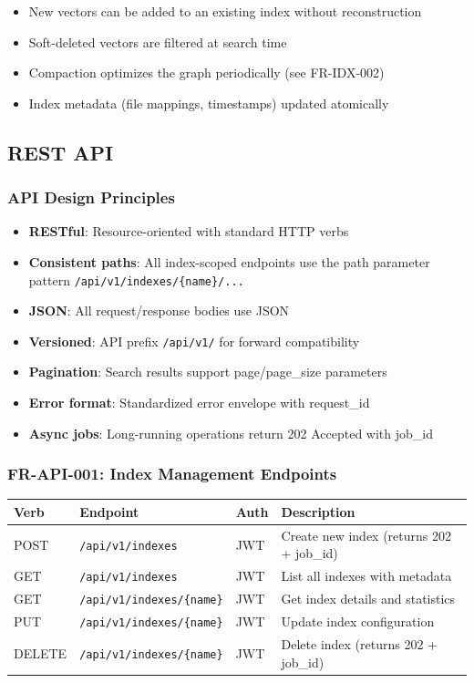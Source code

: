 \documentclass[11pt,a4paper]{article}
\newcommand{\apipath}[1]{\texttt{\small\textcolor{ctAccentBlue}{#1}}}
\begin{document}
\begin{itemize}
    \item New vectors can be added to an existing index without reconstruction
    \item Soft-deleted vectors are filtered at search time
    \item Compaction optimizes the graph periodically (see FR-IDX-002)
    \item Index metadata (file mappings, timestamps) updated atomically
\end{itemize}

\subsection{REST API}

\subsubsection{API Design Principles}

\begin{itemize}
    \item \textbf{RESTful}: Resource-oriented with standard HTTP verbs
    \item \textbf{Consistent paths}: All index-scoped endpoints use the path parameter pattern \apipath{/api/v1/indexes/\{name\}/...}
    \item \textbf{JSON}: All request/response bodies use JSON
    \item \textbf{Versioned}: API prefix \apipath{/api/v1/} for forward compatibility
    \item \textbf{Pagination}: Search results support page/page\_size parameters
    \item \textbf{Error format}: Standardized error envelope with request\_id
    \item \textbf{Async jobs}: Long-running operations return 202 Accepted with job\_id
\end{itemize}

\subsubsection{FR-API-001: Index Management Endpoints}

\begin{longtable}{@{}p{1.5cm}p{4.5cm}p{3cm}p{5cm}@{}}
\toprule
\textbf{Verb} & \textbf{Endpoint} & \textbf{Auth} & \textbf{Description} \\
\midrule
\endhead
POST & \apipath{/api/v1/indexes} & JWT & Create new index (returns 202 + job\_id) \\
GET & \apipath{/api/v1/indexes} & JWT & List all indexes with metadata \\
GET & \apipath{/api/v1/indexes/\{name\}} & JWT & Get index details and statistics \\
PUT & \apipath{/api/v1/indexes/\{name\}} & JWT & Update index configuration \\
DELETE & \apipath{/api/v1/indexes/\{name\}} & JWT & Delete index (returns 202 + job\_id) \\
\bottomrule
\end{longtable}
\end{document}
